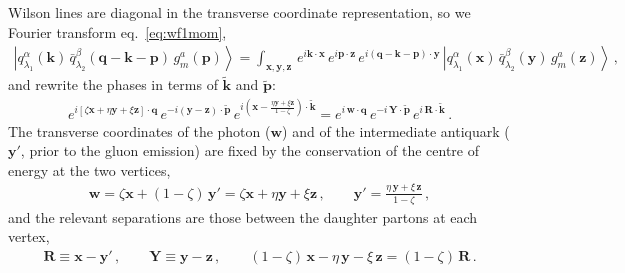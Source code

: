 \documentclass[11pt,a4paper]{article}
\newcommand{\ket}[1]{\left|#1\right\rangle}
\newcommand{\vx}{\bm{x}}
\newcommand{\vy}{\bm{y}}
\newcommand{\vz}{\bm{z}}
\newcommand{\vw}{\bm{w}}
\newcommand{\vR}{\bm{R}}
\newcommand{\vY}{\bm{Y}}
\newcommand{\vk}{\bm{k}}
\newcommand{\vp}{\bm{p}}
\newcommand{\vq}{\bm{q}}
\newcommand{\kt}{\widetilde{\bm{k}}}
\newcommand{\pt}{\widetilde{\bm{p}}}
\numberwithin{equation}{section}
\begin{document}
Wilson lines are diagonal in the transverse coordinate representation, so we Fourier transform
eq.~\eqref{eq:wf1mom},
\begin{align}
\ket{q^{\alpha}_{\lambda_{1}}(\vk)\,\bar q^{\beta}_{\lambda_{2}}(\vq-\vk-\vp)\,g^{a}_{m}(\vp)}
= \int_{\vx,\vy,\vz}\, e^{i\vk\cdot \vx}\, e^{i\vp\cdot \vz}\,
e^{i(\vq-\vk-\vp)\cdot \vy}\,\ket{q^{\alpha}_{\lambda_{1}}(\vx)\,\bar q^{\beta}_{\lambda_{2}}(\vy)\,
g^{a}_{m}(\vz)}\,,
\end{align}
and rewrite the phases in terms of $\kt$ and $\pt$:
\begin{align}
\label{eq:phases}
e^{i[\zeta\vx +\eta \vy + \xi\vz]\cdot \vq}\,e^{-i(\vy-\vz)\cdot \pt}\,
e^{i\left(\vx-\frac{\eta\vy + \xi\vz}{1-\zeta}\right)\cdot \kt}
= e^{i\,\vw\cdot \vq}\, e^{-i\,\vY\cdot \pt}\, e^{i\,\vR\cdot \kt}\,.
\end{align}
The transverse coordinates of the photon ($\vw$) and of the intermediate antiquark ($\vy'$,
prior to the gluon emission) are fixed by the conservation of the centre of energy at the two
vertices,
\begin{align}
\label{eq:wyprime}
\vw = \zeta\vx +(1-\zeta)\,\vy' = \zeta\vx + \eta\vy + \xi\vz\,,\qquad
\vy' = \frac{\eta\,\vy + \xi\,\vz}{1-\zeta}\,,
\end{align}
and the relevant separations are those between the daughter partons at each vertex,
\begin{align}
\label{eq:RY}
\vR \equiv \vx - \vy'\,,\qquad \vY \equiv \vy-\vz\,,\qquad
(1-\zeta)\,\vx - \eta\,\vy -\xi\,\vz = (1-\zeta)\,\vR\,.
\end{align}
\end{document}
